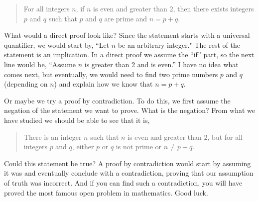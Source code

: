 \documentclass[12pt]{article}
\begin{document}
\begin{quote}
For all integers $n$, if $n$ is even and greater than 2, then there exists integers $p$ and $q$ such that $p$ and $q$ are prime and $n = p+q$.
\end{quote}

What would a direct proof look like?  Since the statement starts with a universal quantifier, we would start by, ``Let $n$ be an arbitrary integer."  The rest of the statement is an implication.  In a direct proof we assume the ``if'' part, so the next line would be, ``Assume $n$ is greater than 2 and is even.''  I have no idea what comes next, but eventually, we would need to find two prime numbers $p$ and $q$ (depending on $n$) and explain how we know that $n = p+q$.  

Or maybe we try a proof by contradiction.  To do this, we first assume the negation of the statement we want to prove.  What is the negation?  From what we have studied we should be able to see that it is,

\begin{quote}
There is an integer $n$ such that $n$ is even and greater than $2$, but for all integers $p$ and $q$, either $p$ or $q$ is not prime or $n \ne p+q$.
\end{quote} 

Could this statement be true?  A proof by contradiction would start by assuming it was and eventually conclude with a contradiction, proving that our assumption of truth was incorrect.  And if you can find such a contradiction, you will have proved the most famous open problem in mathematics.  Good luck.
\end{document}
